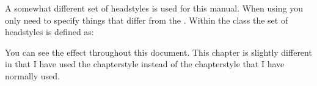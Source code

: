     A somewhat different set of headstyles is used for this manual. When using
\cmd{\makeheadstyles} you only need to specify things that differ from
the . Within the class the  set of headstyles
is defined as:
\begin{lcode}
\newcommand*{\addperiod}[1]{#1.}
\end{lcode}
    You can see the effect throughout this document. This chapter is
slightly different in that I have used the  chapterstyle
instead of the  chapterstyle that I have normally used.

